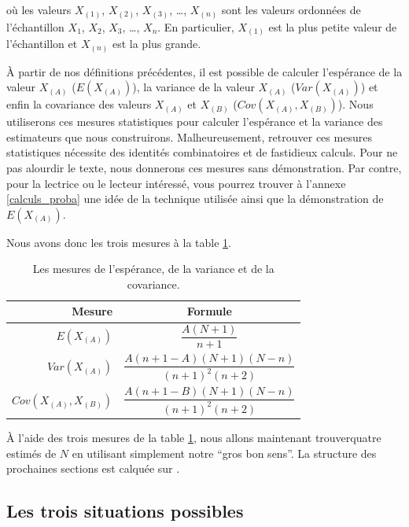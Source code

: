 \documentclass[10pt]{article}
\begin{document}
où les valeurs \(X_{(1)}\), \(X_{(2)}\), \(X_{(3)}\), \ldots{},
\(X_{(n)}\) sont les valeurs ordonnées de l'échantillon \(X_1\),
\(X_2\), \(X_3\), \ldots{}, \(X_n\). En particulier, \(X_{(1)}\) est la
plus petite valeur de l'échantillon et \(X_{(n)}\) est la plus grande.

À partir de nos définitions précédentes, il est possible de calculer
l'espérance de la valeur \(X_{(A)}\) (\(E(X_{(A)})\)), la variance de la
valeur \(X_{(A)}\) (\(Var(X_{(A)})\)) et enfin la covariance des valeurs
\(X_{(A)}\) et \(X_{(B)}\) (\(Cov(X_{(A)},X_{(B)})\)). Nous utiliserons
ces mesures statistiques pour calculer l'espérance et la variance des
estimateurs que nous construirons. Malheureusement, retrouver ces
mesures statistiques nécessite des identités combinatoires et de
fastidieux calculs. Pour ne pas alourdir le texte, nous donnerons ces
mesures sans démonstration. Par contre, pour la lectrice ou le lecteur
intéressé, vous pourrez trouver à l'annexe \ref{calculs_proba} une idée
de la technique utilisée ainsi que la démonstration de \(E(X_{(A)})\).

Nous avons donc les trois mesures à la table \ref{tab:mesures_stat}.

\begin{table}[ht]
\begin{center}
\begin{tabular}{|r|c|}
\hline
Mesure & Formule \\
\hline
\hline
$E(X_{(A)})$ & $\dfrac{A(N+1)}{n+1}$ \\ \hline
$Var(X_{(A)})$ & $\dfrac{A(n+1-A)(N+1)(N-n)}{(n+1)^2(n+2)}$ \\ \hline
$Cov(X_{(A)},X_{(B)})$ & $\dfrac{A(n+1-B)(N+1)(N-n)}{(n+1)^2(n+2)}$ \\ \hline
\end{tabular}
\end{center}
\caption{\label{tab:mesures_stat} {Les mesures de l'espérance, de la variance et de la covariance.} }
\end{table}

À l'aide des trois mesures de la table \ref{tab:mesures_stat}, nous
allons maintenant trouverquatre estimés de \(N\) en utilisant simplement
notre ``gros bon sens''. La structure des prochaines sections est
calquée sur \cite{Johnson}.

\subsection{Les trois situations
possibles}\label{les-trois-situations-possibles}
\end{document}
